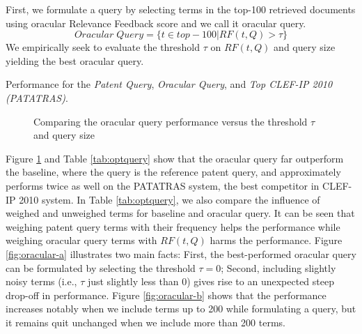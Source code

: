 First, we formulate a query by selecting terms in the top-100 retrieved documents using oracular Relevance Feedback score and we call it oracular query. 
\begin{equation}
Oracular \; Query = \{t \in top-100|RF(t, Q)>\tau\}   
 \label{eq:score}
\end{equation}
We empirically seek to evaluate the threshold $\tau$ on $RF(t,Q)$ and query size yielding the best oracular query.
\begin{table}[t!]
  \begin{center}
  \scriptsize
   \caption{Performance for the \textit{Patent Query}, \textit{ Oracular Query}, and \textit{ Top CLEF-IP 2010 (PATATRAS)}.}
   \vspace*{1ex}
     
  \label{tab:optquery}
  \end{center}  
\end{table}
\begin{figure}[t!]
\begin{centering}
 \hspace*{1.5cm}  
\par\end{centering} 
\protect\caption{Comparing the oracular query performance versus the threshold $\tau$ and query size}
\label{fig:oracular}
\end{figure}

Figure \ref{fig:oracular} and Table \ref{tab:optquery} show that the oracular query far outperform the baseline, where the query is the reference patent query, and approximately performs twice as well on the PATATRAS system, the best competitor in CLEF-IP 2010 system. In Table \ref{tab:optquery}, we also compare the influence of weighed and unweighed terms for baseline and oracular query. It can be seen that weighing patent query terms with their frequency helps the performance while weighing oracular query terms with $RF(t, Q)$ harms the performance.  Figure \ref{fig:oracular-a} illustrates two main facts: First, the best-performed oracular query can be formulated by selecting the threshold $\tau=0$; Second, including slightly noisy terms (i.e., $\tau$ just slightly less than 0) gives rise to an unexpected steep drop-off in performance. Figure \ref{fig:oracular-b} shows that the performance increases notably when we include terms up to 200 while formulating a query, but it remains quit unchanged when we include more than 200 terms. 


